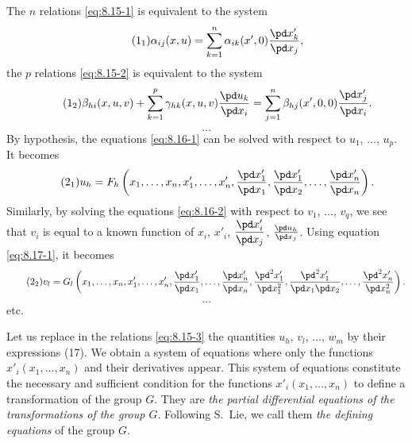 The $n$ relations \eqref{eq:8.15-1} is equivalent to the system
\begin{equation}\addtocounter{equation}{1}
  \label{eq:8.16-1}\tag{\arabic{equation}$_{1}$}
  \alpha_{ij}(x,u)=\sum_{k=1}^{n}\alpha_{ik}(x',0)\frac{\pd x'_{k}}{\pd x_{j}},
\end{equation}
the $p$ relations \eqref{eq:8.15-2} is equivalent to the system
\begin{equation}
  \label{eq:8.16-2}\tag{\arabic{equation}$_{2}$}
  \beta_{hi}(x,u,v)+\sum_{k=1}^{p}\gamma_{hk}(x,u,v)\frac{\pd u_{k}}{\pd x_{i}}=\sum_{j=1}^{n}\beta_{hj}(x',0,0)\frac{\pd x'_{j}}{\pd x_{i}}.
\end{equation}
\[\hdots\]
By hypothesis, the equations \eqref{eq:8.16-1} can be solved with respect to $u_{1}$, $\dots$, $u_{p}$. It becomes
\begin{equation}\addtocounter{equation}{1}
  \label{eq:8.17-1}\tag{\arabic{equation}$_{1}$}
  u_{h}=F_{h}\left(x_{1},\dots,x_{n},x'_{1},\dots,x'_{n},\frac{\pd x'_{1}}{\pd x_{1}},\frac{\pd x'_{1}}{\pd x_{2}},\dots,\frac{\pd x'_{n}}{\pd x_{n}}\right).
\end{equation}
Similarly, by solving the equations \eqref{eq:8.16-2} with respect to $v_{1}$, $\dots$, $v_{q}$, we see that $v_{i}$ is equal to a known function of $x_{i}$, $x'_{i}$, $\dfrac{\pd x'_{i}}{\pd x_{j}}$, $\frac{\pd u_{h}}{\pd x_{j}}$. Using equation \eqref{eq:8.17-1}, it becomes
\begin{equation}
  \label{eq:8.17-2}\tag{\arabic{equation}$_{2}$}
  v_{l}=G_{l}\left(x_{1},\dots,x_{n},x'_{1},\dots,x'_{n},\frac{\pd x'_{1}}{\pd x_{1}},\dots,\frac{\pd x'_{n}}{\pd x_{n}},\frac{\pd^{2}x'_{1}}{\pd x^{2}_{1}},\frac{\pd^{2}x'_{1}}{\pd x_{1}\pd x_{2}},\dots,\frac{\pd^{2}x'_{n}}{\pd x^{2}_{n}}\right).
\end{equation}
\[\hdots\]
etc.

Let us replace in the relations \eqref{eq:8.15-3} the quantities $u_{h}$, $v_{l}$, $\dots$, $w_{m}$ by their expressions (17). We obtain a system of equations where only the functions $x'_{i}(x_{1},\dots,x_{n})$ and their derivatives appear. This system of equations constitute the necessary and sufficient condition for the functions $x'_{i}(x_{1},\dots,x_{n})$ to define a transformation of the group $G$. They are \emph{the partial differential equations of the transformations of the group $G$}. Following S.~Lie, we call them \emph{the defining equations} of the group $G$.

\somespace

